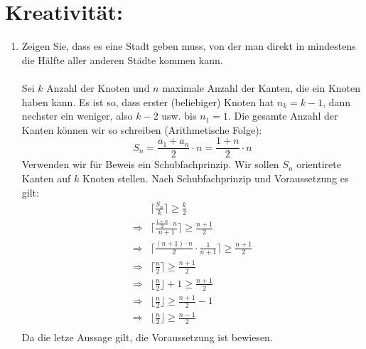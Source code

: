     \section*{Kreativit\"at:}
    \begin{enumerate}[label=(\alph*)]
    	\item Zeigen Sie, dass es eine Stadt geben muss, von der man direkt in mindestens die Hälfte
		aller anderen Städte kommen kann.\\\\
		Sei $k$ Anzahl der Knoten und $n$ maximale Anzahl der Kanten, die ein Knoten haben kann. 
		Es ist so, dass erster (beliebiger) Knoten hat $n_k = k-1$, dann nechster ein weniger, 
		also $k-2$ usw. bis $n_1 = 1$. 
		Die gesamte Anzahl der Kanten k\"onnen wir so schreiben (Arithmetische Folge): 
		\[S_n = \frac{a_1+a_n}{2}\cdot n = \frac{1+n}{2}\cdot n\]
		Verwenden wir f\"ur Beweis ein Schubfachprinzip. Wir sollen $S_n$ orientirete Kanten auf $k$ 
		Knoten stellen. Nach Schubfachprinzip und Voraussetzung es gilt: 
		\begin{align*}
			&\bigg\lceil\frac{S_n}{k}\bigg\rceil \geq \frac{k}{2} \\
			\Rightarrow &\bigg\lceil\frac{\frac{1+n}{2}\cdot n}{n+1}\bigg\rceil \geq \frac{n+1}{2}\\
			\Rightarrow &\bigg\lceil\frac{(n+1)\cdot n}{2} \cdot \frac{1}{n+1}\bigg\rceil \geq \frac{n+1}{2}\\
			\Rightarrow &\bigg\lceil\frac{n}{2}\bigg\rceil \geq \frac{n+1}{2}\\
			\Rightarrow &\bigg\lfloor\frac{n}{2}\bigg\rfloor + 1 \geq \frac{n+1}{2}\\
			\Rightarrow &\bigg\lfloor\frac{n}{2}\bigg\rfloor \geq \frac{n+1}{2} - 1\\
			\Rightarrow &\bigg\lfloor\frac{n}{2}\bigg\rfloor \geq \frac{n-1}{2}\\
		\end{align*}
		Da die letze Aussage gilt, die Voraussetzung ist bewiesen.
    \end{enumerate}
